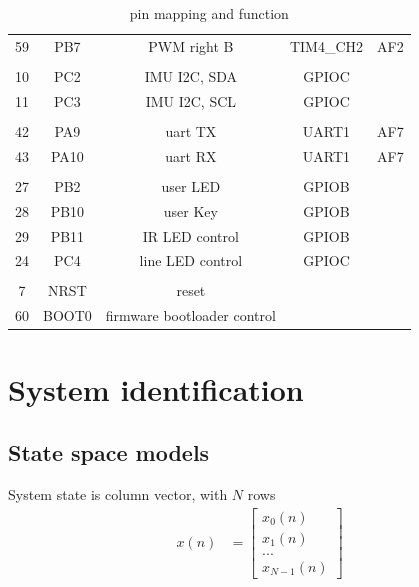 \documentclass[12pt,twoside,onecolumn,openany,extrafontsizes,dvipsnames]{memoir}
\begin{document}
\begin{table}[h!]
\begin{tabular}{||c c c c c||}
                    59 & PB7 & PWM right B  & TIM4\_CH2 & AF2 \\ 
                    & & & & \\
                    10 & PC2 & IMU I2C, SDA & GPIOC &  \\ 
                    11 & PC3 & IMU I2C, SCL & GPIOC &  \\ 
                    & & & & \\
                    42 & PA9 & uart TX & UART1 & AF7 \\ 
                    43 & PA10 & uart RX & UART1 & AF7 \\ 
                    & & & & \\
                    27 & PB2 & user LED & GPIOB &  \\ 
                    28 & PB10 & user Key & GPIOB &  \\ 
                    29 & PB11 & IR LED control & GPIOB &  \\ 
                    24 & PC4 & line LED control & GPIOC &  \\ 
                    & & & & \\
                    7 & NRST & reset &  &  \\ 
                    60 & BOOT0 & firmware bootloader control &  &  \\ 
                \hline
                \end{tabular}
            \caption{pin mapping and function}
            \label{table:1}
        \end{table}

\newpage
\chapter{System identification}

    \section{State space models}

        System state is column vector, with $N$ rows
        \begin{align}
            x(n) &= \begin{bmatrix} x_{0}(n) \\ x_{1}(n) \\ ... \\ x_{N-1}(n) \end{bmatrix}
        \end{align}
\end{document}
